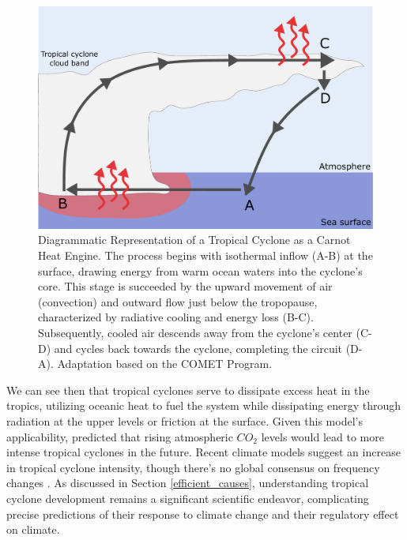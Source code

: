 \begin{figure}[h!]
\begin{center}
\setcaptionmargin{1cm}
\includegraphics[width=0.9\columnwidth,angle=0]{fig/carnot_cycle.pdf}
\caption[Tropical Cyclone as a Carnot Cycle]{Diagrammatic Representation of a Tropical Cyclone as a Carnot Heat Engine. The process begins with isothermal inflow (A-B) at the surface, drawing energy from warm ocean waters into the cyclone's core. This stage is succeeded by the upward movement of air (convection) and outward flow just below the tropopause, characterized by radiative cooling and energy loss (B-C). Subsequently, cooled air descends away from the cyclone's center (C-D) and cycles back towards the cyclone, completing the circuit (D-A). Adaptation based on the COMET Program.}
\label{carnot_cycle}
\end{center}
\end{figure}


We can see then that tropical cyclones serve to dissipate excess heat in the tropics, utilizing oceanic heat to fuel the system while dissipating energy through radiation at the upper levels or friction at the surface. Given this model's applicability, \citet{emanuel1987dependence} predicted that rising atmospheric $CO_2$ levels would lead to more intense tropical cyclones in the future. Recent climate models suggest an increase in tropical cyclone intensity, though there's no global consensus on frequency changes \citep{knutson2010tropical,walsh2004tropical,walsh2016tropical,walsh2019tropical}. As discussed in Section \ref{efficient_causes}, understanding tropical cyclone development remains a significant scientific endeavor, complicating precise predictions of their response to climate change and their regulatory effect on climate.


